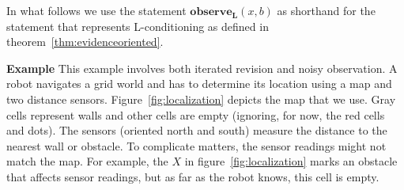 \documentclass{llncs}
\newcommand{\Rank}[1]{\hspace{3pt} \pmb{\langle} #1 \pmb{\rangle}\hspace{3pt} } %
\begin{document}
In what follows we use the statement $\textbf{observe}_{\textbf{L}}(x, b)$ as shorthand for the statement that represents L-conditioning as defined in theorem~\ref{thm:evidenceoriented}.

\textbf{Example} This example involves both iterated revision and noisy observation.
A robot navigates a grid world and has to determine its location using a map and two distance sensors.
Figure~\ref{fig:localization} depicts the map that we use.
Gray cells represent walls and other cells are empty (ignoring, for now, the red cells and dots).
The sensors (oriented north and south) measure the distance to the nearest wall or obstacle.
To complicate matters, the sensor readings might not match the map.
For example, the $X$ in figure~\ref{fig:localization} marks an obstacle that affects sensor readings, but as far as the robot knows, this cell is empty.
\end{document}
